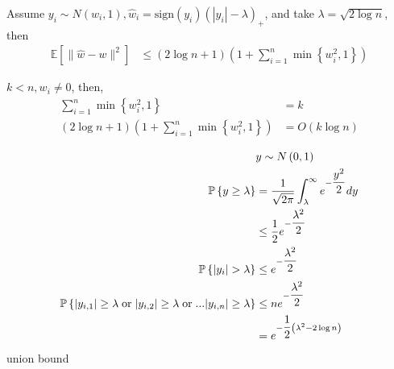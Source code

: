 \documentclass{article}
\begin{document}
\begin{thm} \label{thm:sft} 
Assume $y_{i} \sim  N\left(w_{i}, 1\right), \hat{w}_{i} = \text{sign}\left(y_{i}\right)\left(| y_{i} | - \lambda\right)_{+}$, and take $\lambda = \sqrt{2 \log n}$, then
\begin{align*}
\mathbb{E}\left[\| \hat{w} - w \|^{2}\right] &\leq  \left(2 \log n + 1\right)\left(1 + \displaystyle\sum_{i=1}^{n} \displaystyle\min\left\{w_{i}^{2}, 1\right\}\right)
\end{align*}\end{thm}
\begin{eg} \label{eg:sftn} 
$k  < n , w_{i} \neq  0$, then,
\begin{align*}
\displaystyle\sum_{i=1}^{n} \displaystyle\min\left\{w_{i}^{2}, 1\right\} &= k 
\\ \left(2 \log n + 1\right)\left(1 + \displaystyle\sum_{i=1}^{n} \displaystyle\min\left\{w_{i}^{2}, 1\right\}\right) &= O\left(k \log n \right) 
\end{align*}\end{eg}
\begin{align*}
&y  \sim  N\left(0, 1\right)
\\ \mathbb{P}\left\{y \geq  \lambda\right\} &= \dfrac{1}{\sqrt{2 \pi}} \displaystyle\int_{\lambda}^{\infty} e^{- \dfrac{y^{2}}{2}} dy
\\ &\leq  \dfrac{1}{2} e^{- \dfrac{\lambda^{2}}{2}}
\\ \mathbb{P}\left\{| y_{i} | > \lambda\right\} &\leq  e^{- \dfrac{\lambda^{2}}{2}}
\\ \mathbb{P}\left\{| y_{i,1} | \geq  \lambda \text{\;or\;} | y_{i,2} | \geq  \lambda \text{\;or\;} ... | y_{i,n} | \geq  \lambda\right\} &\leq  n e^{- \dfrac{\lambda^{2}}{2}}
\\ &= e^{- \dfrac{1}{2} \left(\lambda^{2} - 2 \log n\right)}
\end{align*}
union bound
\end{document}

